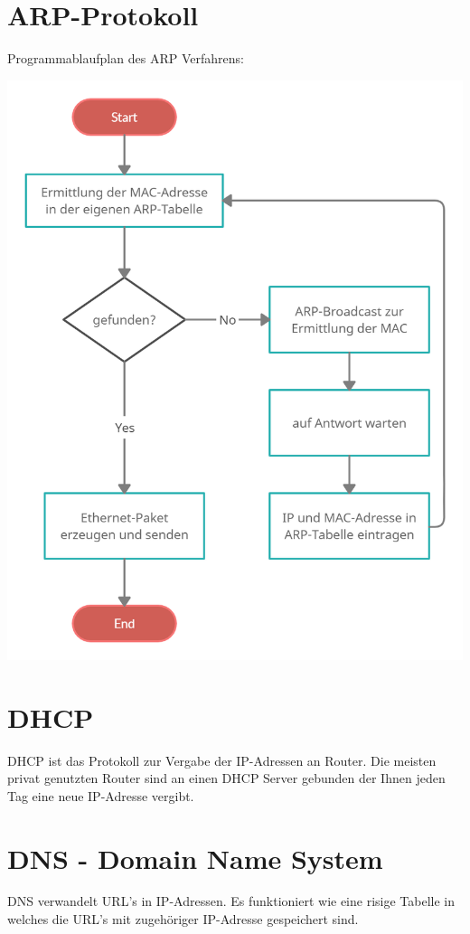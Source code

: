 \documentclass[12pt,a4paper]{article}
\begin{document}
		\section{ARP-Protokoll}
			Programmablaufplan des ARP Verfahrens:
			\begin{center}
				\includegraphics[scale=0.3]{Bilder/ARP-Protokoll PAP.png}
			\end{center}

		\section{DHCP}
		DHCP ist das Protokoll zur Vergabe der IP-Adressen an Router. Die meisten privat genutzten Router sind an einen DHCP Server gebunden der Ihnen jeden Tag eine neue IP-Adresse vergibt. 

		\section{DNS - Domain Name System}
		DNS verwandelt URL's in IP-Adressen. Es funktioniert wie eine risige Tabelle in welches die URL's mit zugehöriger IP-Adresse gespeichert sind.
\end{document}
